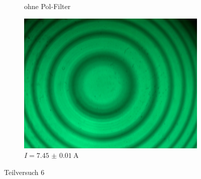 \begin{figure}[!ht]
\begin{subfigure}{0.48\textwidth}
			\caption{ohne Pol-Filter}
			\vspace{0.5\baselineskip}
		\end{subfigure}
		\begin{subfigure}{0.48\textwidth}
			\centering
			\includegraphics[width=\textwidth]{images/Capture_823.bmp.jpg}
			\caption{$I = \SI{7.45(1)}{\ampere}$}
			\vspace{0.5\baselineskip}
		\end{subfigure}
	    \caption{Teilversuch 6}
	\end{figure}